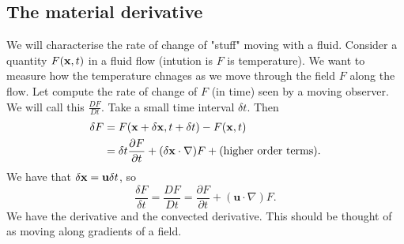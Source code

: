 \documentclass{article}
\begin{document}
\subsection{The material derivative}
We will characterise the rate of change of "stuff" moving with a fluid. Consider a quantity $ F(\mathbf{x},t) $ in a fluid flow (intution is $ F $ is temperature). We want to measure how the temperature chnages as we move through the field $ F $ along the flow. Let compute the rate of change of $ F $ (in time) seen by a moving observer. We will call this $ \frac{DF}{Dt} $. Take a small time interval $ \delta t $. Then
\begin{align*}
	\delta F &= F(\mathbf{x}+\delta\mathbf{x},t+\delta t)-F(\mathbf{x},t)\\
		 &= \delta t\frac{\partial F}{\partial t}+(\delta\mathbf{x}\cdot \nabla)F + \text{(higher order terms)}.
\end{align*}
We have that $ \delta\mathbf{x}=\mathbf u\delta t $, so
\[
	\frac{\delta F}{\delta t}=\frac{DF}{Dt}=\frac{\partial F}{\partial t}+(\mathbf u \cdot \nabla)F.
\]
We have the derivative and the convected derivative. This should be thought of as moving along gradients of a field.
\end{document}
